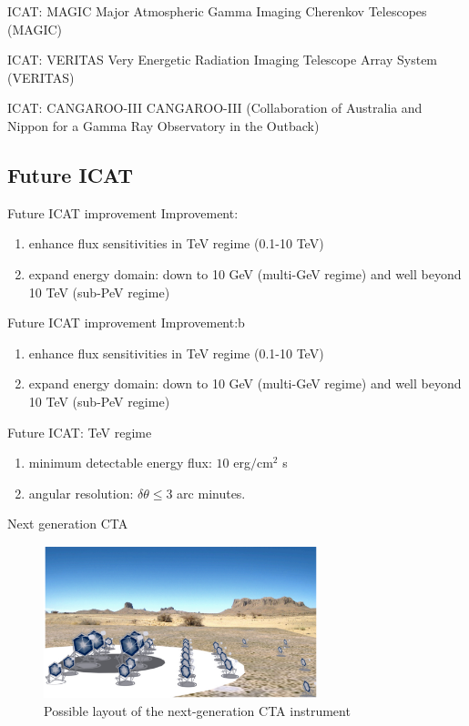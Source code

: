 \documentclass{beamer}
\begin{document}
\begin{frame}{ICAT: MAGIC}
	Major Atmospheric Gamma Imaging Cherenkov Telescopes (MAGIC)
\end{frame}


\begin{frame}{ICAT: VERITAS}
	Very Energetic Radiation Imaging Telescope Array System (VERITAS)
\end{frame}


\begin{frame}{ICAT: CANGAROO-III}
	CANGAROO-III (Collaboration of Australia and Nippon for a Gamma Ray Observatory in the Outback)
\end{frame}

\subsection{Future ICAT}
\begin{frame}{Future ICAT improvement}
	Improvement:
	\begin{enumerate}
		\item enhance flux sensitivities in TeV regime (0.1-10 TeV)
		\item expand energy domain: down to 10 GeV (multi-GeV regime) and well beyond 10 TeV (sub-PeV regime)
	\end{enumerate}
\end{frame}


\begin{frame}{Future ICAT improvement}
	Improvement:b
	\begin{enumerate}
		\item enhance flux sensitivities in TeV regime (0.1-10 TeV)
		\item expand energy domain: down to 10 GeV (multi-GeV regime) and well beyond 10 TeV (sub-PeV regime)

	\end{enumerate}
\end{frame}


\begin{frame}{Future ICAT: TeV regime}
	\begin{enumerate}
		\item minimum detectable energy flux: $10$ erg$/ \text{cm}^2 $ s
		\item angular resolution: $\delta \theta \leq 3$ arc minutes.
	\end{enumerate}
\end{frame}


\begin{frame}{Next generation CTA}
	\begin{figure}[h]
		\includegraphics[width=300px]{next-generationCTA.png}
		\caption{Possible layout of the next-generation CTA instrument}
	\end{figure}
\end{frame}
\end{document}
